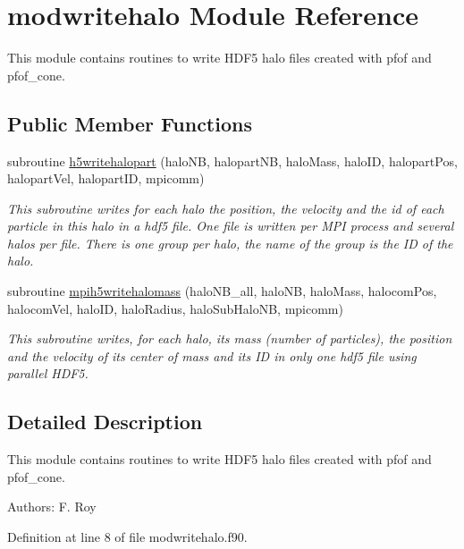 \hypertarget{classmodwritehalo}{\section{modwritehalo Module Reference}
\label{classmodwritehalo}
}


This module contains routines to write H\-D\-F5 halo files created with pfof and pfof\-\_\-cone.  


\subsection*{Public Member Functions}
\begin{DoxyCompactItemize}
\item 
subroutine \hyperlink{classmodwritehalo_a8106d4405e4178f9b94b2cf9f850b8bd}{h5writehalopart} (halo\-N\-B, halopart\-N\-B, halo\-Mass, halo\-I\-D, halopart\-Pos, halopart\-Vel, halopart\-I\-D, mpicomm)
\begin{DoxyCompactList}\small\item\em This subroutine writes for each halo the position, the velocity and the id of each particle in this halo in a hdf5 file. One file is written per M\-P\-I process and several halos per file. There is one group per halo, the name of the group is the I\-D of the halo. \end{DoxyCompactList}\item 
subroutine \hyperlink{classmodwritehalo_a89848d0de917714b051873fda01d98d1}{mpih5writehalomass} (halo\-N\-B\-\_\-all, halo\-N\-B, halo\-Mass, halocom\-Pos, halocom\-Vel, halo\-I\-D, halo\-Radius, halo\-Sub\-Halo\-N\-B, mpicomm)
\begin{DoxyCompactList}\small\item\em This subroutine writes, for each halo, its mass (number of particles), the position and the velocity of its center of mass and its I\-D in only one hdf5 file using parallel H\-D\-F5. \end{DoxyCompactList}\end{DoxyCompactItemize}


\subsection{Detailed Description}
This module contains routines to write H\-D\-F5 halo files created with pfof and pfof\-\_\-cone. 

Authors\-: F. Roy 

Definition at line 8 of file modwritehalo.\-f90.



